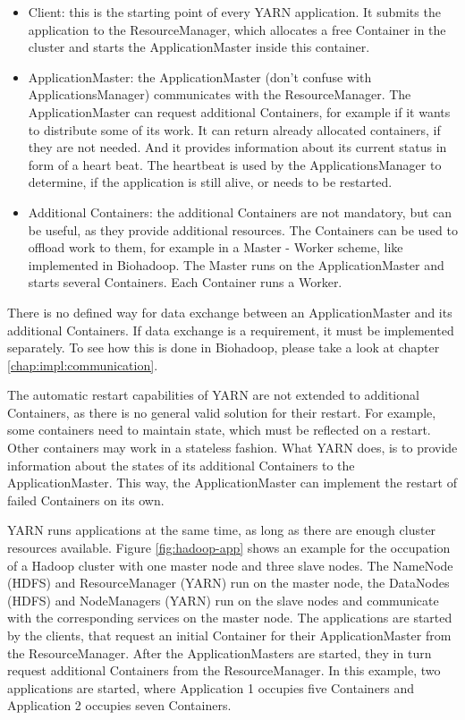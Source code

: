 \begin{itemize}
  \item Client: this is the starting point of every YARN application. It submits the application to the ResourceManager, which allocates a free Container in the cluster and starts the ApplicationMaster inside this container.
  \item ApplicationMaster: the ApplicationMaster (don't confuse with ApplicationsManager) communicates with the ResourceManager. The ApplicationMaster can request additional Containers, for example if it wants to distribute some of its work. It can return already allocated containers, if they are not needed. And it provides information about its current status in form of a heart beat. The heartbeat is used by the ApplicationsManager to determine, if the application is still alive, or needs to be restarted.
  \item Additional Containers: the additional Containers are not mandatory, but can be useful, as they provide additional resources. The Containers can be used to offload work to them, for example in a Master - Worker scheme, like implemented in Biohadoop. The Master runs on the ApplicationMaster and starts several Containers. Each Container runs a Worker.
\end{itemize}

There is no defined way for data exchange between an ApplicationMaster and its additional Containers. If data exchange is a requirement, it must be implemented separately. To see how this is done in Biohadoop, please take a look at chapter \ref{chap:impl:communication}.

The automatic restart capabilities of YARN are not extended to additional Containers, as there is no general valid solution for their restart. For example, some containers need to maintain state, which must be reflected on a restart. Other containers may work in a stateless fashion. What YARN does, is to provide information about the states of its additional Containers to the ApplicationMaster. This way, the ApplicationMaster can implement the restart of failed Containers on its own.

YARN runs applications at the same time, as long as there are enough cluster resources available. Figure \ref{fig:hadoop-app} shows an example for the occupation of a Hadoop cluster with one master node and three slave nodes. The NameNode (HDFS) and ResourceManager (YARN) run on the master node, the DataNodes (HDFS) and NodeManagers (YARN) run on the slave nodes and communicate with the corresponding services on the master node. The applications are started by the clients, that request an initial Container for their ApplicationMaster from the ResourceManager. After the ApplicationMasters are started, they in turn request additional Containers from the ResourceManager. In this example, two applications are started, where Application 1 occupies five Containers and Application 2 occupies seven Containers.

